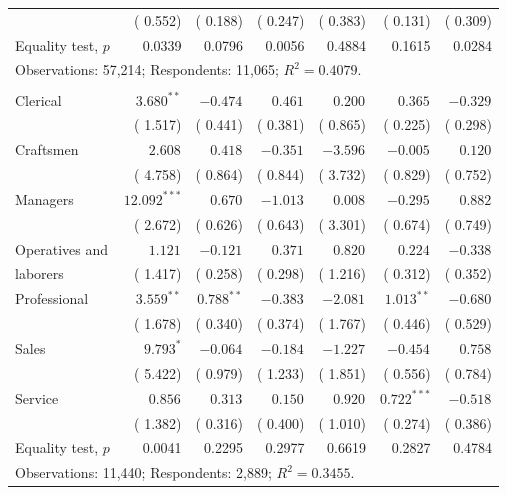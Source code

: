 \begin{table}[p]
\begin{threeparttable}
\begin{tabular*}{\textwidth}{@{\extracolsep{\fill}}lrrrrrr@{}}
 & ( 0.552) & ( 0.188) & ( 0.247) & ( 0.383) & ( 0.131) & ( 0.309) \\
\addlinespace Equality test, \(p\) & 0.0339 & 0.0796 & 0.0056 & 0.4884 & 0.1615 & 0.0284 \\
\multicolumn{7}{l}{Observations:       57,214; Respondents:       11,065; \(R^2=0.4079\).} \\
\addlinespace \multicolumn{7}{l}{B. NLSY97} \\
Clerical & \( 3.680^{**}\) & \(-0.474^{}\) & \( 0.461^{}\) & \( 0.200^{}\) & \( 0.365^{}\) & \(-0.329^{}\) \\
 & ( 1.517) & ( 0.441) & ( 0.381) & ( 0.865) & ( 0.225) & ( 0.298) \\
Craftsmen & \( 2.608^{}\) & \( 0.418^{}\) & \(-0.351^{}\) & \(-3.596^{}\) & \(-0.005^{}\) & \( 0.120^{}\) \\
 & ( 4.758) & ( 0.864) & ( 0.844) & ( 3.732) & ( 0.829) & ( 0.752) \\
Managers & \(12.092^{***}\) & \( 0.670^{}\) & \(-1.013^{}\) & \( 0.008^{}\) & \(-0.295^{}\) & \( 0.882^{}\) \\
 & ( 2.672) & ( 0.626) & ( 0.643) & ( 3.301) & ( 0.674) & ( 0.749) \\
Operatives and & \( 1.121^{}\) & \(-0.121^{}\) & \( 0.371^{}\) & \( 0.820^{}\) & \( 0.224^{}\) & \(-0.338^{}\) \\
laborers & ( 1.417) & ( 0.258) & ( 0.298) & ( 1.216) & ( 0.312) & ( 0.352) \\
Professional & \( 3.559^{**}\) & \( 0.788^{**}\) & \(-0.383^{}\) & \(-2.081^{}\) & \( 1.013^{**}\) & \(-0.680^{}\) \\
 & ( 1.678) & ( 0.340) & ( 0.374) & ( 1.767) & ( 0.446) & ( 0.529) \\
Sales & \( 9.793^{*}\) & \(-0.064^{}\) & \(-0.184^{}\) & \(-1.227^{}\) & \(-0.454^{}\) & \( 0.758^{}\) \\
 & ( 5.422) & ( 0.979) & ( 1.233) & ( 1.851) & ( 0.556) & ( 0.784) \\
Service & \( 0.856^{}\) & \( 0.313^{}\) & \( 0.150^{}\) & \( 0.920^{}\) & \( 0.722^{***}\) & \(-0.518^{}\) \\
 & ( 1.382) & ( 0.316) & ( 0.400) & ( 1.010) & ( 0.274) & ( 0.386) \\
\addlinespace Equality test, \(p\) & 0.0041 & 0.2295 & 0.2977 & 0.6619 & 0.2827 & 0.4784 \\
\multicolumn{7}{l}{Observations:       11,440; Respondents:        2,889; \(R^2=0.3455\).} \\
\bottomrule\end{tabular*}

\end{threeparttable}
\end{table}
